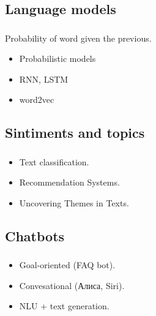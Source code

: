 \documentclass[t, 11pt]{beamer}
\begin{document}
	
	\subsection{Language models}
	
	\begin{frame}\label{lm}
		\frametitle{\insertsection}
		\frametitle{\insertsubsection}
		Probability of word given the previous.
		\begin{itemize}
			\item Probabilistic models 
			\item RNN, LSTM 
			\item word2vec 
			
			\vspace{1cm}
		\end{itemize}
	\end{frame}
	
	\subsection{Sintiments and topics}
	\begin{frame}\label{sents}
		\frametitle{\insertsection}
		\frametitle{\insertsubsection}
		\begin{itemize}
			\item Text classification.
			\item Recommendation Systems.
			\item Uncovering Themes in Texts. 
		\end{itemize}
	\end{frame}

		\subsection{Chatbots}
	\begin{frame}\label{chatbots}
		\frametitle{\insertsection}
		\frametitle{\insertsubsection}
		\begin{itemize}
			\item Goal-oriented (FAQ bot).
			\item Convesational (Алиса, Siri).
			\item NLU + text generation. 
		\end{itemize}
	\end{frame}

	
	
\end{document}
